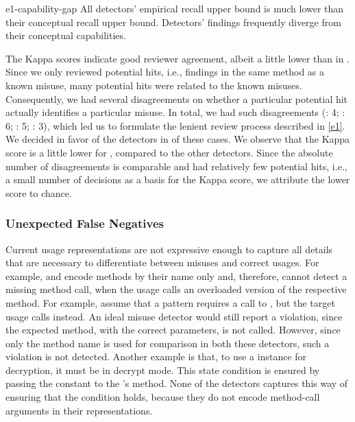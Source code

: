 \begin{obs}{e1-capability-gap}
  All detectors' empirical recall upper bound is much lower than their conceptual recall upper bound.
  Detectors' findings frequently diverge from their conceptual capabilities.
\end{obs}

The Kappa scores indicate good reviewer agreement, albeit a little lower than in .
Since we only reviewed potential hits, i.e., findings in the same method as a known misuse, many potential hits were related to the known misuses.
Consequently, we had several disagreements on whether a particular potential hit actually identifies a particular misuse.
In total, we had  such disagreements (\Jadet: 4; \GROUMiner: 6; \DMMC: 5; \Tikanga: 3), which led us to formulate the lenient review process described in \autoref{e1}.
We decided in favor of the detectors in  of these cases.
%
We observe that the Kappa score is a little lower for \Jadet, compared to the other detectors.
Since the absolute number of disagreements is comparable and \Jadet had relatively few potential hits, i.e., a small number of decisions as a basis for the Kappa score, we attribute the lower score to chance.

\subsubsection*{Unexpected False Negatives}


\vspace{0.03in}
Current usage representations are not expressive enough to capture all details that are necessary to differentiate between misuses and correct usages.
For example, \DMMC and \GROUMiner encode methods by their name only and, therefore, cannot detect a missing method call, when the usage calls an overloaded version of the respective method.
For example, assume that a pattern requires a call to , but the target usage calls  instead.
An ideal misuse detector would still report a violation, since the expected method, with the correct parameters, is not called.
However, since only the method name is used for comparison in both these detectors, such a violation is not detected.
%
Another example is that, to use a  instance for decryption, it must be in decrypt mode.
This state condition is ensured by passing the constant  to the 's  method.
None of the detectors captures this way of ensuring that the condition holds, because they do not encode method-call arguments in their representations.


